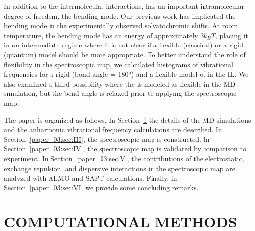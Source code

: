 \documentclass[%
  class = book,%
  crop = false,%
  float = true,%
  multi = true,%
  preview = false,%
]{standalone}
\let\cite\autocite
\newcommand{\caps}[1]{\uppercase{#1}}
\begin{document}
In addition to the intermolecular interactions,  has an important intramolecular degree of freedom, the bending mode. Our previous work\cite{Brinzer2015} has implicated the bending mode in the experimentally observed solvatochromic shifts. At room temperature, the bending mode has an energy of approximately \(3k_{B}T\), placing it in an intermediate regime where it is not clear if a flexible (classical) or a rigid (quantum) model should be more appropriate. To better understand the role of  flexibility in the spectroscopic map, we calculated histograms of vibrational frequencies for a rigid (bond angle = \ang{180}) and a flexible model of  in the \ce{[C4C1im][PF6]} IL. We also examined a third possibility where the  is modeled as flexible in the MD simulation, but the bend angle is relaxed prior to applying the spectroscopic map.

The paper is organized as follows. In Section~\ref{paper_03:sec:II} the details of the MD simulations and the anharmonic vibrational frequency calculations are described. In Section~\ref{paper_03:sec:III}, the spectroscopic map is constructed. In Section~\ref{paper_03:sec:IV}, the spectroscopic map is validated by comparison to experiment. In Section~\ref{paper_03:sec:V}, the contributions of the electrostatic, exchange repulsion, and dispersive interactions in the spectroscopic map are analyzed with ALMO and SAPT calculations. Finally, in Section~\ref{paper_03:sec:VI} we provide some concluding remarks.

\section{\texorpdfstring{\caps{Computational Methods}}{Computational Methods}}
\label{paper_03:sec:II}
\end{document}
